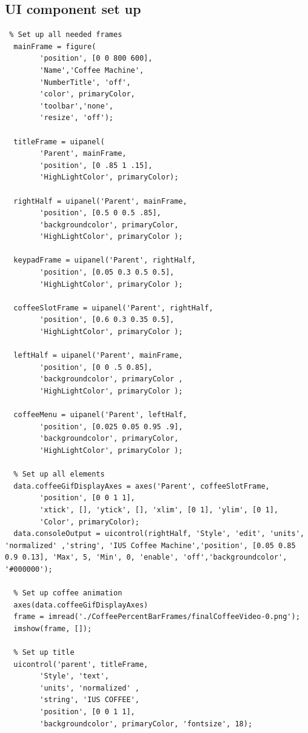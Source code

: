 \documentclass[a4paper, 10pt]{article}
\begin{document}
		\subsection{UI component set up}
			\begin{lstlisting}
 % Set up all needed frames
  mainFrame = figure(
		'position', [0 0 800 600],
		'Name','Coffee Machine',
		'NumberTitle', 'off',
		'color', primaryColor,
		'toolbar','none',
		'resize', 'off');

  titleFrame = uipanel(
		'Parent', mainFrame,
		'position', [0 .85 1 .15],
		'HighLightColor', primaryColor);

  rightHalf = uipanel('Parent', mainFrame,
		'position', [0.5 0 0.5 .85],
		'backgroundcolor', primaryColor,
		'HighLightColor', primaryColor );

  keypadFrame = uipanel('Parent', rightHalf,
		'position', [0.05 0.3 0.5 0.5],
		'HighLightColor', primaryColor );

  coffeeSlotFrame = uipanel('Parent', rightHalf,
		'position', [0.6 0.3 0.35 0.5],
		'HighLightColor', primaryColor );

  leftHalf = uipanel('Parent', mainFrame,
		'position', [0 0 .5 0.85],
		'backgroundcolor', primaryColor ,
		'HighLightColor', primaryColor );
		
  coffeeMenu = uipanel('Parent', leftHalf,
		'position', [0.025 0.05 0.95 .9],
		'backgroundcolor', primaryColor,
		'HighLightColor', primaryColor );

  % Set up all elements
  data.coffeeGifDisplayAxes = axes('Parent', coffeeSlotFrame,
		'position', [0 0 1 1],
		'xtick', [], 'ytick', [], 'xlim', [0 1], 'ylim', [0 1],
		'Color', primaryColor);
  data.consoleOutput = uicontrol(rightHalf, 'Style', 'edit', 'units', 'normalized' ,'string', 'IUS Coffee Machine','position', [0.05 0.85 0.9 0.13], 'Max', 5, 'Min', 0, 'enable', 'off','backgroundcolor', '#000000');

  % Set up coffee animation
  axes(data.coffeeGifDisplayAxes)
  frame = imread('./CoffeePercentBarFrames/finalCoffeeVideo-0.png');
  imshow(frame, []);

  % Set up title
  uicontrol('parent', titleFrame,
		'Style', 'text',
		'units', 'normalized' ,
		'string', 'IUS COFFEE',
		'position', [0 0 1 1],
		'backgroundcolor', primaryColor, 'fontsize', 18);

			\end{lstlisting}
\end{document}
